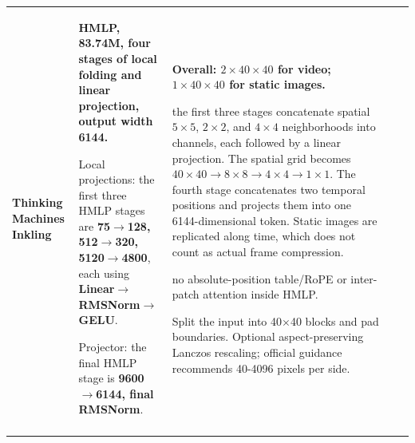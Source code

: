 \begin{longtable}{@{}P{0.100\dimexpr\textwidth-40pt\relax}P{0.230\dimexpr\textwidth-40pt\relax}P{0.290\dimexpr\textwidth-40pt\relax}P{0.240\dimexpr\textwidth-40pt\relax}P{0.140\dimexpr\textwidth-40pt\relax}@{}}
{\bfseries Thinking Machines Inkling} & {\bfseries HMLP, 83.\allowbreak{}74M, four stages of local folding and linear projection, output width 6144.\allowbreak{}}\par\vspace{1pt}Local projections: the first three HMLP stages are {\bfseries 75\(\rightarrow\)128, 512\(\rightarrow\)320, 5120\(\rightarrow\)4800}, each using {\bfseries Linear\(\rightarrow\)RMSNorm\(\rightarrow\)GELU}.\allowbreak{}\par\vspace{1pt}Projector: the final HMLP stage is {\bfseries 9600\(\rightarrow\)6144, final RMSNorm}.\allowbreak{} & {\bfseries Overall: \(2\times 40\times 40\) for video; \(1\times 40\times 40\) for static images.\allowbreak{}}\par{} the first three stages concatenate spatial \(5\times 5\), \(2\times 2\), and \(4\times 4\) neighborhoods into channels, each followed by a linear projection.\allowbreak{} The spatial grid becomes \(40\times 40\rightarrow 8\times 8\rightarrow 4\times 4\rightarrow 1\times 1\).\allowbreak{} The fourth stage concatenates two temporal positions and projects them into one 6144-\allowbreak{}dimensional token.\allowbreak{} Static images are replicated along time, which does not count as actual frame compression.\allowbreak{}\par\vspace{1pt}{\bfseries Position:} no absolute-\allowbreak{}position table/\allowbreak{}RoPE or inter-\allowbreak{}patch attention inside HMLP.\allowbreak{}\par{} Split the input into 40\(\times\)40 blocks and pad boundaries.\allowbreak{} Optional aspect-\allowbreak{}preserving Lanczos rescaling; official guidance recommends 40-4096 pixels per side.\allowbreak{} & \textemdash{} & \textemdash{} \\
\addlinespace[6pt]

\end{longtable}

